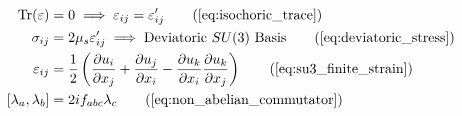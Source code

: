 \begin{tcolorbox}[recallbox, title={\ref{box:hookes_su3}. Generalized Hooke's Law \& $SU(3)$}]
\begin{align}
    \text{Tr}(\varepsilon) &= 0 \implies \varepsilon_{ij} = \varepsilon'_{ij} \tag{\ref{eq:isochoric_trace}} \\
    \sigma_{ij} &= 2\mu_s \varepsilon'_{ij} \implies \text{Deviatoric } SU(3) \text{ Basis} \tag{\ref{eq:deviatoric_stress}} \\
    \varepsilon_{ij} &= \frac{1}{2} \left( \frac{\partial u_i}{\partial x_j} + \frac{\partial u_j}{\partial x_i} - \frac{\partial u_k}{\partial x_i} \frac{\partial u_k}{\partial x_j} \right) \tag{\ref{eq:su3_finite_strain}} \\
    [\lambda_a, \lambda_b] &= 2i f_{abc} \lambda_c \tag{\ref{eq:non_abelian_commutator}}
\end{align}
\end{tcolorbox}





